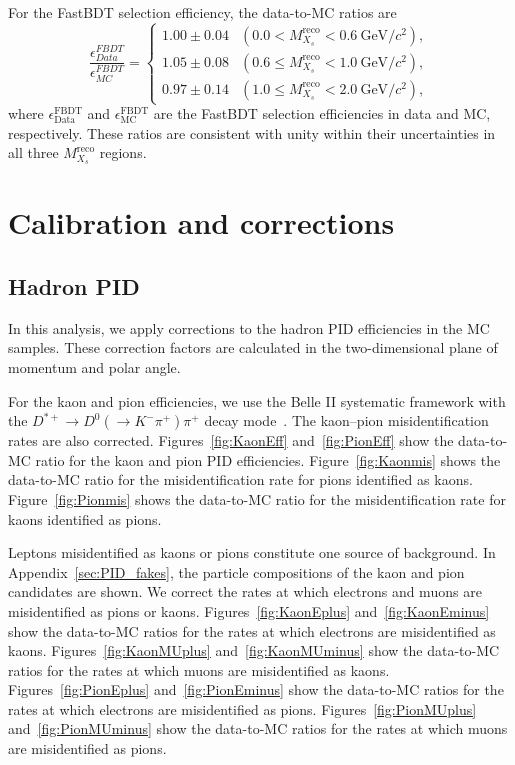 For the FastBDT selection efficiency, the data-to-MC ratios are
\begin{equation}
      \label{eq:FBDT_efficiency_ratio_data_MC_XsJpsi}
      \frac{\epsilon_{Data}^{FBDT}}{\epsilon_{MC}^{FBDT}} = 
    \begin{cases}
      1.00 \pm 0.04 & (0.0 < M_{X_{s}}^{\textrm{reco}} < 0.6~\textrm{GeV}/c^{2}), \\[10pt]
      1.05 \pm 0.08 & (0.6 \leq M_{X_{s}}^{\textrm{reco}} < 1.0~\textrm{GeV}/c^{2}), \\[10pt]
      0.97 \pm 0.14 & (1.0 \leq M_{X_{s}}^{\textrm{reco}} < 2.0~\textrm{GeV}/c^{2}),
    \end{cases}
\end{equation}
where $\epsilon_{\textrm{Data}}^{\textrm{FBDT}}$ and $\epsilon_{\textrm{MC}}^{\textrm{FBDT}}$ are the FastBDT selection efficiencies in data and MC, respectively.
These ratios are consistent with unity within their uncertainties in all three $M_{X_{s}}^{\textrm{reco}}$ regions.

\chapter{Calibration and corrections}
\label{chap:correction}
\section{Hadron PID}
\label{sec:pid_correction}
In this analysis, we apply corrections to the hadron PID efficiencies in the MC samples.
These correction factors are calculated in the two-dimensional plane of momentum and polar angle.

For the kaon and pion efficiencies, we use the Belle II systematic framework with the $D^{*+}\rightarrow D^{0}(\rightarrow K^{-}\pi^{+})\pi^{+}$ decay mode~\cite{Belle-II:2025tpe}.
The kaon--pion misidentification rates are also corrected.
Figures~\ref{fig:KaonEff} and~\ref{fig:PionEff} show the data-to-MC ratio for the kaon and pion PID efficiencies.
Figure~\ref{fig:Kaonmis} shows the data-to-MC ratio for the misidentification rate for pions identified as kaons.
Figure~\ref{fig:Pionmis} shows the data-to-MC ratio for the misidentification rate for kaons identified as pions.

Leptons misidentified as kaons or pions constitute one source of background.
In Appendix~\ref{sec:PID_fakes}, the particle compositions of the kaon and pion candidates are shown.
We correct the rates at which electrons and muons are misidentified as pions or kaons.
Figures~\ref{fig:KaonEplus} and~\ref{fig:KaonEminus} show the data-to-MC ratios for the rates at which electrons are misidentified as kaons.
Figures~\ref{fig:KaonMUplus} and~\ref{fig:KaonMUminus} show the data-to-MC ratios for the rates at which muons are misidentified as kaons.
Figures~\ref{fig:PionEplus} and~\ref{fig:PionEminus} show the data-to-MC ratios for the rates at which electrons are misidentified as pions.
Figures~\ref{fig:PionMUplus} and~\ref{fig:PionMUminus} show the data-to-MC ratios for the rates at which muons are misidentified as pions.

